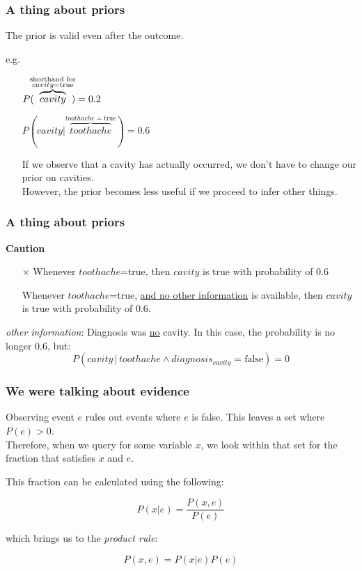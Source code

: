 \begin{frame}\frametitle{A thing about priors}

The prior is valid even after the outcome.

e.g.\\
\begin{itemize}
 \item[] $P( \kern-1ex \overbrace{cavity}^{\substack{\text{shorthand for}\\{cavity}=\text{true}}} \kern-1ex) = 0.2$
 \item[] $P(cavity | \overbrace{toothache}^{{toothache}=\text{true}}) = 0.6$
 \item[] If we observe that a cavity has actually occurred, we don't have to change our prior on cavities.\\
 However, the prior becomes less useful if we proceed to infer other things.
\end{itemize}


\end{frame}

\begin{frame}\frametitle{A thing about priors}
    
\textbf{Caution}\\
\begin{itemize}
\item[$\times$] Whenever $toothache$=true, then $cavity$ is true with probability of 0.6
\item[\checkmark] Whenever $toothache$=true, \underline{and no other information} is available, then $cavity$ is true with probability of 0.6.
\end{itemize}

\textit{other information}: Diagnosis was \underline{no} cavity. In this case, the probability is no longer 0.6, but:
\begin{equation}
P(cavity \,|\, toothache \wedge diagnosis_{cavity} = \text{false}) = 0
\end{equation}

\end{frame}

\begin{frame}\frametitle{We were talking about evidence}

Observing event $e$ rules out events where $e$ is false. This leaves a set where $P(e)>0$.\\
Therefore, when we query for some variable $x$,
we look within that set for the fraction that satisfies $x$ and $e$.

This fraction can be calculated using the following:

\begin{equation}
P(x|e) = \frac{P(x,e)}{P(e)}
\end{equation}

which brings us to the \emph{product rule}:

\begin{equation}
P(x,e) = P(x|e) P(e)
\label{eq:productrule}    
\end{equation}

\end{frame}

